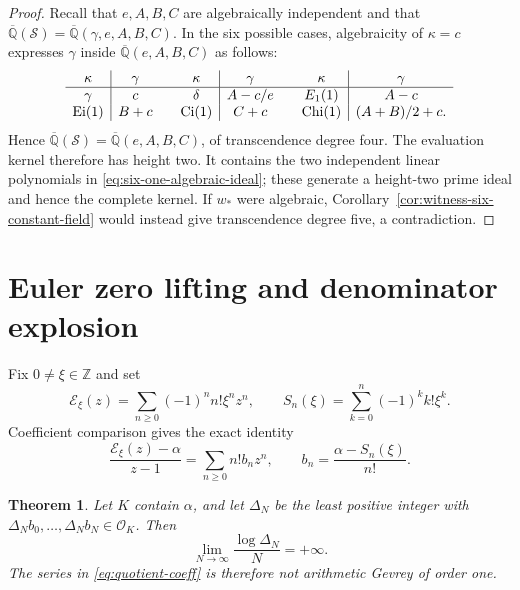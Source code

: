 \documentclass[11pt]{article}
\newtheorem{theorem}{Theorem}[section]
\theoremstyle{definition}
\theoremstyle{remark}
\newcommand{\Qbar}{\overline{\mathbb Q}}
\newcommand{\Z}{\mathbb Z}
\newcommand{\Ei}{\operatorname{Ei}}
\newcommand{\Ci}{\operatorname{Ci}}
\newcommand{\Chi}{\operatorname{Chi}}
\newcommand{\Eul}{\mathcal E}
\newcommand{\OO}{\mathcal O}
\begin{document}
\begin{proof}
Recall that \(e,A,B,C\) are algebraically independent and that
\(\Qbar(\mathcal S)=\Qbar(\gamma,e,A,B,C)\).  In the six possible cases,
algebraicity of \(\kappa=c\) expresses \(\gamma\) inside
\(\Qbar(e,A,B,C)\) as follows:
\[
\begin{array}{c|c@{\qquad}c|c@{\qquad}c|c}
 \kappa&\gamma&\kappa&\gamma&\kappa&\gamma\\ \hline
 \gamma&c&\delta&A-c/e&E_1(1)&A-c\\
 \Ei(1)&B+c&\Ci(1)&C+c&\Chi(1)&(A+B)/2+c.
\end{array}
\]
Hence \(\Qbar(\mathcal S)=\Qbar(e,A,B,C)\), of transcendence degree four.
The evaluation kernel therefore has height two.  It contains the two
independent linear polynomials in \eqref{eq:six-one-algebraic-ideal}; these
generate a height-two prime ideal and hence the complete kernel.  If \(w_*\)
were algebraic, Corollary~\ref{cor:witness-six-constant-field} would instead
give transcendence degree five, a contradiction.
\end{proof}





\section{Euler zero lifting and denominator explosion}

Fix \(0\ne\xi\in\Z\) and set
\[
 \Eul_\xi(z)=\sum_{n\ge0}(-1)^n n!\xi^nz^n,
 \qquad
 S_n(\xi)=\sum_{k=0}^n(-1)^k k!\xi^k.
\]
Coefficient comparison gives the exact identity
\begin{equation}\label{eq:quotient-coeff}
 \frac{\Eul_\xi(z)-\alpha}{z-1}
 =\sum_{n\ge0}n!b_nz^n,\qquad
 b_n=\frac{\alpha-S_n(\xi)}{n!}.
\end{equation}

\begin{theorem}\label{thm:denominator}
Let \(K\) contain \(\alpha\), and let \(\Delta_N\) be the least positive
integer with \(\Delta_Nb_0,\ldots,\Delta_Nb_N\in\OO_K\).  Then
\[
 \lim_{N\to\infty}\frac{\log\Delta_N}{N}=+\infty.
\]
The series in \eqref{eq:quotient-coeff} is therefore not arithmetic Gevrey of
order one.
\end{theorem}
\end{document}
